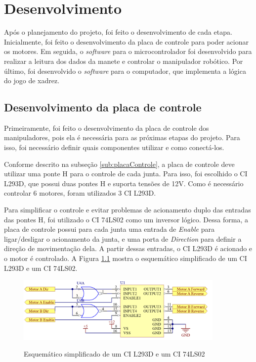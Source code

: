 \chapter[Desenvolvimento]{Desenvolvimento}
\label{cap:desenvolvimento}

Após o planejamento do projeto, foi feito o desenvolvimento de cada etapa.
Inicialmente, foi feito o desenvolvimento da placa de controle para poder acionar os motores.
Em seguida, o \textit{software} para o microcontrolador foi desenvolvido para realizar a leitura dos dados da manete e controlar o manipulador robótico.
Por último, foi desenvolvido o \textit{software} para o computador, que implementa a lógica do jogo de xadrez.

\section[Desenvolvimento da placa de controle]{Desenvolvimento da placa de controle}
\label{sec:desenvolvimentoPlacaControle}

Primeiramente, foi feito o desenvolvimento da placa de controle dos manipuladores, pois ela é necessária para as próximas etapas do projeto.
Para isso, foi necessário definir quais componentes utilizar e como conectá-los.

Conforme descrito na subseção \ref{sub:placaControle}, a placa de controle deve utilizar uma ponte H para o controle de cada junta.
Para isso, foi escolhido o CI L293D, que possui duas pontes H e suporta tensões de 12V.
Como é necessário controlar 6 motores, foram utilizados 3 CI L293D.

Para simplificar o controle e evitar problemas de acionamento duplo das entradas das pontes H, foi utilizado o CI 74LS02 como um inversor lógico.
Dessa forma, a placa de controle possui para cada junta uma entrada de \textit{Enable} para ligar/desligar o acionamento da junta, e uma porta de \textit{Direction} para definir a direção de movimentação dela.
A partir dessas entradas, o CI L293D é acionado e o motor é controlado.
A Figura \ref{fig:esquematicoSimplificado} mostra o esquemático simplificado de um CI L293D e um CI 74LS02.

\begin{figure}[H]
    \centering
    \caption{Esquemático simplificado de um CI L293D e um CI 74LS02}
    \includegraphics[keepaspectratio=true, width=0.9\textwidth]
    	{img/placa-controle-esquematico-simplificado.png}
    \label{fig:esquematicoSimplificado}
\end{figure}

